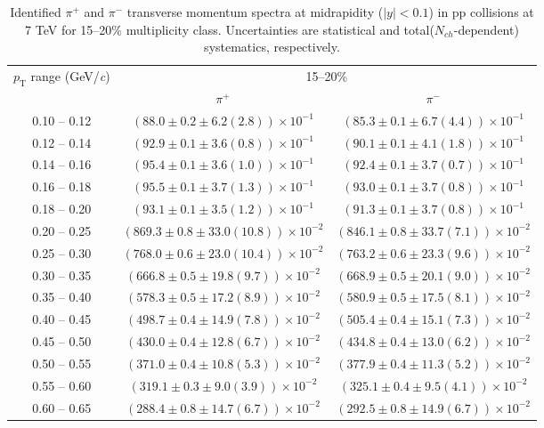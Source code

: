 \begin{table}
\caption{Identified $\pi^{+}$ and $\pi^{-}$  transverse momentum spectra at midrapidity ($|y|<0.1$) in pp collisions at 7 TeV for 15--20\% multiplicity class. Uncertainties are statistical and total($N_{ch}$-dependent) systematics, respectively.}
\label{tab:PionPlus_PionMinus_15to20}
\begin{center}
\begin{tabular}{ c | c c }
\hline
\multirow{2}{*}{$p_{\mathrm{T}}$ range (GeV/\textit{c})} & \multicolumn{2}{c}{15--20\%} \\ & $\pi^{+}$& $\pi^{-}$\\ 
\hline
0.10 -- 0.12 & $(88.0\pm0.2\pm6.2(2.8))\times10^{-1}$ & $(85.3\pm0.1\pm6.7(4.4))\times10^{-1}$ \\ 
0.12 -- 0.14 & $(92.9\pm0.1\pm3.6(0.8))\times10^{-1}$ & $(90.1\pm0.1\pm4.1(1.8))\times10^{-1}$ \\ 
0.14 -- 0.16 & $(95.4\pm0.1\pm3.6(1.0))\times10^{-1}$ & $(92.4\pm0.1\pm3.7(0.7))\times10^{-1}$ \\ 
0.16 -- 0.18 & $(95.5\pm0.1\pm3.7(1.3))\times10^{-1}$ & $(93.0\pm0.1\pm3.7(0.8))\times10^{-1}$ \\ 
0.18 -- 0.20 & $(93.1\pm0.1\pm3.5(1.2))\times10^{-1}$ & $(91.3\pm0.1\pm3.7(0.8))\times10^{-1}$ \\ 
0.20 -- 0.25 & $(869.3\pm0.8\pm33.0(10.8))\times10^{-2}$ & $(846.1\pm0.8\pm33.7(7.1))\times10^{-2}$ \\ 
0.25 -- 0.30 & $(768.0\pm0.6\pm23.0(10.4))\times10^{-2}$ & $(763.2\pm0.6\pm23.3(9.6))\times10^{-2}$ \\ 
0.30 -- 0.35 & $(666.8\pm0.5\pm19.8(9.7))\times10^{-2}$ & $(668.9\pm0.5\pm20.1(9.0))\times10^{-2}$ \\ 
0.35 -- 0.40 & $(578.3\pm0.5\pm17.2(8.9))\times10^{-2}$ & $(580.9\pm0.5\pm17.5(8.1))\times10^{-2}$ \\ 
0.40 -- 0.45 & $(498.7\pm0.4\pm14.9(7.8))\times10^{-2}$ & $(505.4\pm0.4\pm15.1(7.3))\times10^{-2}$ \\ 
0.45 -- 0.50 & $(430.0\pm0.4\pm12.8(6.7))\times10^{-2}$ & $(434.8\pm0.4\pm13.0(6.2))\times10^{-2}$ \\ 
0.50 -- 0.55 & $(371.0\pm0.4\pm10.8(5.3))\times10^{-2}$ & $(377.9\pm0.4\pm11.3(5.2))\times10^{-2}$ \\ 
0.55 -- 0.60 & $(319.1\pm0.3\pm9.0(3.9))\times10^{-2}$ & $(325.1\pm0.4\pm9.5(4.1))\times10^{-2}$ \\ 
0.60 -- 0.65 & $(288.4\pm0.8\pm14.7(6.7))\times10^{-2}$ & $(292.5\pm0.8\pm14.9(6.7))\times10^{-2}$ \\ 

\end{tabular}
\end{center}
\end{table}
